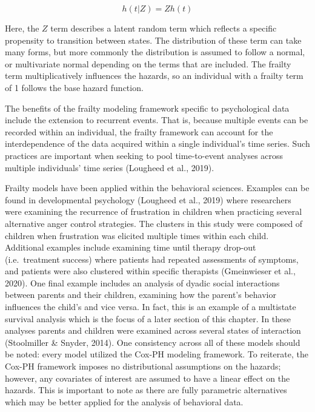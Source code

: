 \documentclass[12pt]{./styles/outhesis}
\begin{document}
\[
h(t|Z) = Zh(t)
\]

Here, the \(Z\) term describes a latent random term which reflects a
specific propensity to transition between states. The distribution of
these term can take many forms, but more commonly the distribution is
assumed to follow a normal, or multivariate normal depending on the
terms that are included. The frailty term multiplicatively influences the
hazards, so an individual with a frailty term of 1 follows the base
hazard function.

The benefits of the frailty modeling framework specific to psychological
data include the extension to recurrent events. That is, because
multiple events can be recorded within an individual, the frailty
framework can account for the interdependence of the data acquired
within a single individual's time series. Such practices are important
when seeking to pool time-to-event analyses across multiple individuals'
time series (Lougheed et al., 2019).

Frailty models have been applied within the behavioral sciences.
Examples can be found in developmental psychology (Lougheed et al.,
2019) where researchers were examining the recurrence of frustration in
children when practicing several alternative anger control strategies.
The clusters in this study were composed of children when frustration
was elicited multiple times within each child. Additional examples
include examining time until therapy drop-out (i.e.~treatment success)
where patients had repeated assessments of symptoms, and patients were
also clustered within specific therapists (Gmeinwieser et al., 2020).
One final example includes an analysis of dyadic social interactions
between parents and their children, examining how the parent's behavior
influences the child's and vice versa. In fact, this is an example of a
multistate survival analysis which is the focus of a later section of
this chapter. In these analyses parents and children were
examined across several states of interaction (Stoolmiller \& Snyder,
2014). One consistency across all of these models should be noted: every
model utilized the Cox-PH modeling framework. To reiterate, the Cox-PH
framework imposes no distributional assumptions on the hazards; however,
any covariates of interest are assumed to have a linear effect on the
hazards. This is important to note as there are fully parametric
alternatives which may be better applied for the analysis of behavioral
data.
\end{document}
